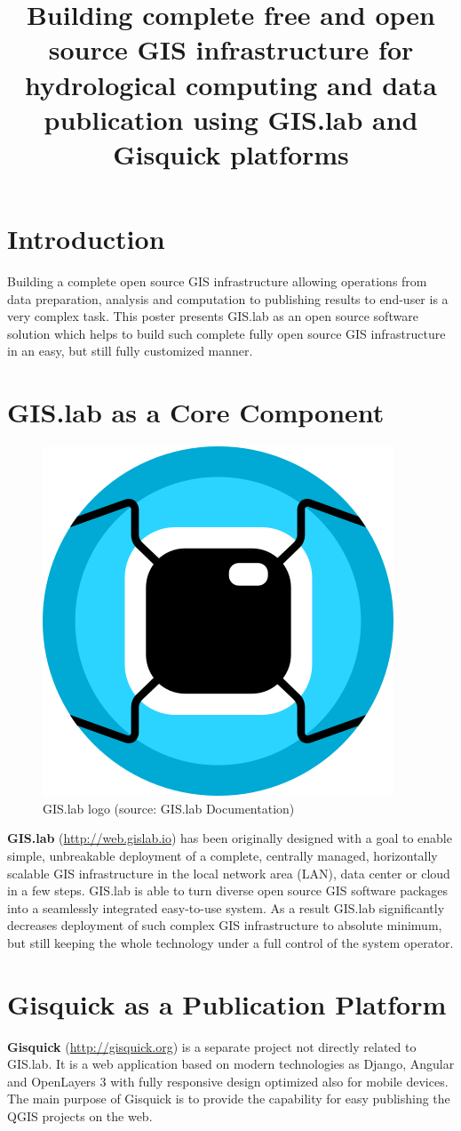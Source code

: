 \documentclass{tudelftposter}
\title{Building complete free and open source GIS infrastructure for
  hydrological computing and data publication using GIS.lab and
  Gisquick platforms}
\begin{document}
\section{Introduction}

Building a complete open source GIS infrastructure allowing operations
from data preparation, analysis and computation to publishing results
to end-user is a very complex task. This poster presents GIS.lab as an
open source software solution which helps to build such complete fully
open source GIS infrastructure in an easy, but still fully customized
manner.

\section{GIS.lab as a Core Component}

\begin{figure}[ht!]
\begin{center}
  \includegraphics[width=.15\columnwidth]{../paper/figures/gislab-logo.png}
  \caption{GIS.lab logo (source: GIS.lab Documentation)}
\label{fig:gislab_logo}
\end{center}
\end{figure}

\noindent \textbf{GIS.lab} (\url{http://web.gislab.io}) has been
originally designed with a goal to enable simple, unbreakable
deployment of a complete, centrally managed, horizontally scalable GIS
infrastructure in the local network area (LAN), data center or cloud
in a few steps. GIS.lab is able to turn diverse open source GIS
software packages into a seamlessly integrated easy-to-use system. As
a result GIS.lab significantly decreases deployment of such complex
GIS infrastructure to absolute minimum, but still keeping the whole
technology under a full control of the system operator.

\section{Gisquick as a Publication Platform}

\textbf{Gisquick} (\url{http://gisquick.org}) is a separate project not
directly related to GIS.lab. It is a web application based on modern
technologies as Django, Angular and OpenLayers 3 with fully responsive
design optimized also for mobile devices. The main purpose of Gisquick
is to provide the capability for easy publishing the QGIS projects on
the web. 
\end{document}
